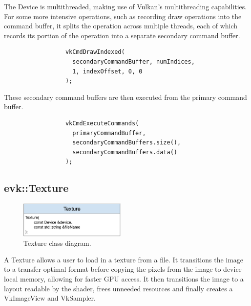 \documentclass[12pt]{report}
\newcommand{\figurewidth}{0.55\textwidth}
\newcommand{\imagewidth}{0.47\textwidth}
\theoremstyle{definition}
\begin{document}
        The Device is multithreaded, making use of Vulkan's multithreading
        capabilities. For some more intensive operations, such as recording
        draw operations into the command buffer, it splits the operation
        across multiple threads, each of which records its portion of the
        operation into a separate secondary command buffer. \\

        \begin{figure}[H]
        \begin{verbatim}
            vkCmdDrawIndexed(
              secondaryCommandBuffer, numIndices,
              1, indexOffset, 0, 0
            );
        \end{verbatim}
        \end{figure}

        These secondary command buffers are then executed from the primary
        command buffer.

        \begin{figure}[H]
        \begin{verbatim}
            vkCmdExecuteCommands(
              primaryCommandBuffer,
              secondaryCommandBuffers.size(),
              secondaryCommandBuffers.data()
            );
        \end{verbatim}
        \end{figure}

      \subsection{evk::Texture}

        \begin{figure}
          \centering
          \includegraphics[width=\imagewidth]{images/class_texture.png}
          \caption{Texture class diagram.}
          \label{fig:class_texture}  
        \end{figure}

        A Texture allows a user to load in a texture from a file. It transitions
        the image to a transfer-optimal format before copying the pixels from
        the image to device-local memory, allowing for faster GPU access. It
        then transitions the image to a layout readable by the shader, frees
        unneeded resources and finally creates a VkImageView and VkSampler. \\
\end{document}
